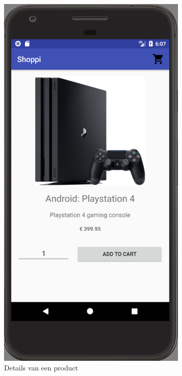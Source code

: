 \begin{figure}[H]
\begin{subfigure}{.5\textwidth}
	\includegraphics[width=0.65\linewidth]{img/poc/android/3.png}
	\caption{Details van een product}
	\label{fig:sub1}
\end{subfigure}%
\begin{subfigure}{.5\textwidth}
	\centering

\end{subfigure}
\end{figure}
